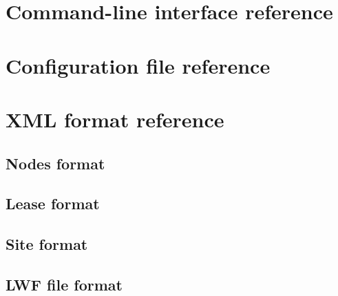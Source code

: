 \documentclass[11pt,oneside]{scrbook}
\begin{document}
\chapter{Command-line interface reference}
\label{app:cli}


\chapter{Configuration file reference}
\label{app:conffile}


\chapter{XML format reference}
\label{app:lwf}


\section{Nodes format}

\section{Lease format}

\section{Site format}

\section{LWF file format}
\end{document}
